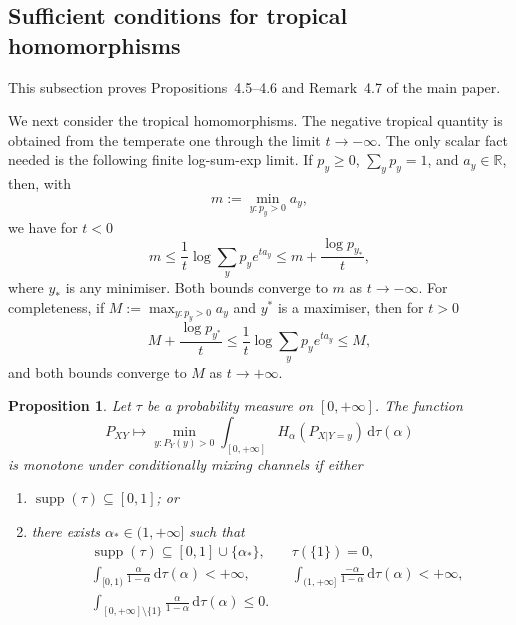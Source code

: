 \documentclass[aps,pra,11pt,onecolumn,nofootinbib,tightenlines]{revtex4-2}
\newtheorem{proposition}[theorem]{Proposition}
\theoremstyle{definition}
\begin{document}
\subsection{Sufficient conditions for tropical homomorphisms}

This subsection proves Propositions~4.5--4.6 and Remark~4.7 of the main paper.

We next consider the tropical homomorphisms. The negative tropical quantity is obtained from the temperate one through the limit $t\to-\infty$. The only scalar fact needed is the following finite log-sum-exp limit. If $p_y\geq0$, $\sum_yp_y=1$, and $a_y\in\mathbb R$, then, with
\begin{equation}
 m:=\min_{y:p_y>0}a_y,
 \label{eq:min-a-y}
\end{equation}
we have for $t<0$
\begin{equation}
 m\leq
 \frac1t\log\sum_yp_ye^{ta_y}
 \leq m+\frac{\log p_{y_*}}t,
 \label{eq:negative-log-sum-exp-bound}
\end{equation}
where $y_*$ is any minimiser. Both bounds converge to $m$ as $t\to-\infty$.
For completeness, if
$M:=\max_{y:p_y>0}a_y$ and $y^*$ is a maximiser, then for $t>0$
\begin{equation}
 M+\frac{\log p_{y^*}}t
 \leq\frac1t\log\sum_yp_ye^{ta_y}\leq M,
 \label{eq:positive-log-sum-exp-bound}
\end{equation}
and both bounds converge to $M$ as $t\to+\infty$.

\begin{proposition}
\label{prop:negative-tropical-sufficient}
Let $\tau$ be a probability measure on $[0,+\infty]$. The function
\begin{equation}
 P_{XY}\longmapsto
 \min_{y:P_Y(y)>0}
 \int_{[0,+\infty]}
 H_\alpha(P_{X|Y=y})\,\mathrm d\tau(\alpha)
 \label{eq:negative-tropical-quantity}
\end{equation}
 is monotone under conditionally mixing channels if either
\begin{enumerate}
 \item $\operatorname{supp}(\tau)\subseteq[0,1]$; or
 \item there exists $\alpha_*\in(1,+\infty]$ such that
 \begin{equation}
  \begin{aligned}
  &\operatorname{supp}(\tau)\subseteq[0,1]\cup\{\alpha_*\},
  &&\tau(\{1\})=0,\\
  &\int_{[0,1)}\frac{\alpha}{1-\alpha}\,\mathrm d\tau(\alpha)<+\infty,
  &&\int_{(1,+\infty]}\frac{-\alpha}{1-\alpha}\,\mathrm d\tau(\alpha)<+\infty,\\
  &\int_{[0,+\infty]\setminus\{1\}}
  \frac{\alpha}{1-\alpha}\,\mathrm d\tau(\alpha)
  \leq0.
  \end{aligned}
  \label{eq:negative-tropical-sufficient-condition}
 \end{equation}
\end{enumerate}
\end{proposition}
\end{document}
